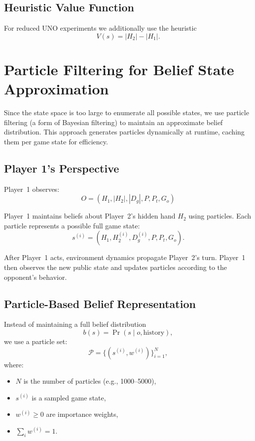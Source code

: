 \documentclass[journal,transmag]{IEEEtran}
\begin{document}
\subsection{Heuristic Value Function}

For reduced UNO experiments we additionally use the heuristic
\[
V(s) = |H_2| - |H_1|.
\]

\section{Particle Filtering for Belief State Approximation}

Since the state space is too large to enumerate all possible states, we use
particle filtering (a form of Bayesian filtering) to maintain an approximate
belief distribution. This approach generates particles dynamically at runtime,
caching them per game state for efficiency.

\subsection{Player 1's Perspective}

Player~1 observes:
\[
O = (H_1, |H_2|, |D_g|, P, P_t, G_o)
\]

Player~1 maintains beliefs about Player~2’s hidden hand $H_2$ using particles.
Each particle represents a possible full game state:
\[
s^{(i)} = (H_1, H_2^{(i)}, D_g^{(i)}, P, P_t, G_o).
\]

After Player~1 acts, environment dynamics propagate Player~2’s turn. Player~1
then observes the new public state and updates particles according to the
opponent’s behavior.

\subsection{Particle-Based Belief Representation}

Instead of maintaining a full belief distribution
\[
b(s) = \Pr(s \mid o, \text{history}),
\]
we use a particle set:
\[
\mathcal{P} = \{ (s^{(i)}, w^{(i)}) \}_{i=1}^{N},
\]
where:
\begin{itemize}
    \item $N$ is the number of particles (e.g., 1000–5000),
    \item $s^{(i)}$ is a sampled game state,
    \item $w^{(i)} \ge 0$ are importance weights,
    \item $\sum_i w^{(i)} = 1$.
\end{itemize}
\end{document}
